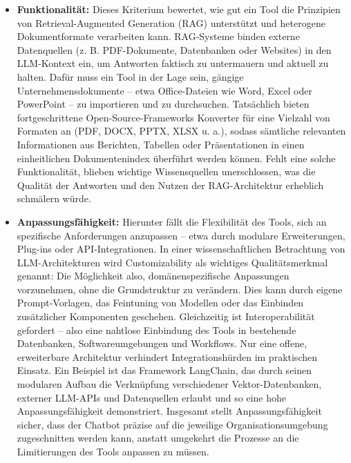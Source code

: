 \begin{itemize}
    \item \textbf{Funktionalität:} Dieses Kriterium bewertet, wie gut ein Tool die Prinzipien von Retrieval-Augmented Generation (RAG) unterstützt und heterogene Dokumentformate verarbeiten kann. RAG-Systeme binden externe Datenquellen (z. B. PDF-Dokumente, Datenbanken oder Websites) in den LLM-Kontext ein, um Antworten faktisch zu untermauern und aktuell zu halten. Dafür muss ein Tool in der Lage sein, gängige Unternehmensdokumente – etwa Office-Dateien wie Word, Excel oder PowerPoint – zu importieren und zu durchsuchen. Tatsächlich bieten fortgeschrittene Open-Source-Frameworks Konverter für eine Vielzahl von Formaten an (PDF, DOCX, PPTX, XLSX u. a.), sodass sämtliche relevanten Informationen aus Berichten, Tabellen oder Präsentationen in einen einheitlichen Dokumentenindex überführt werden können. Fehlt eine solche Funktionalität, blieben wichtige Wissensquellen unerschlossen, was die Qualität der Antworten und den Nutzen der RAG-Architektur erheblich schmälern würde.
    \item \textbf{Anpassungsfähigkeit:} Hierunter fällt die Flexibilität des Tools, sich an spezifische Anforderungen anzupassen – etwa durch modulare Erweiterungen, Plug-ins oder API-Integrationen. In einer wissenschaftlichen Betrachtung von LLM-Architekturen wird Customizability als wichtiges Qualitätsmerkmal genannt: Die Möglichkeit also, domänenspezifische Anpassungen vorzunehmen, ohne die Grundstruktur zu verändern. Dies kann durch eigene Prompt-Vorlagen, das Feintuning von Modellen oder das Einbinden zusätzlicher Komponenten geschehen. Gleichzeitig ist Interoperabilität gefordert – also eine nahtlose Einbindung des Tools in bestehende Datenbanken, Softwareumgebungen und Workflows. Nur eine offene, erweiterbare Architektur verhindert Integrationshürden im praktischen Einsatz. Ein Beispiel ist das Framework LangChain, das durch seinen modularen Aufbau die Verknüpfung verschiedener Vektor-Datenbanken, externer LLM-APIs und Datenquellen erlaubt und so eine hohe Anpassungsfähigkeit demonstriert. Insgesamt stellt Anpassungsfähigkeit sicher, dass der Chatbot präzise auf die jeweilige Organisationsumgebung zugeschnitten werden kann, anstatt umgekehrt die Prozesse an die Limitierungen des Tools anpassen zu müssen.

\end{itemize}
